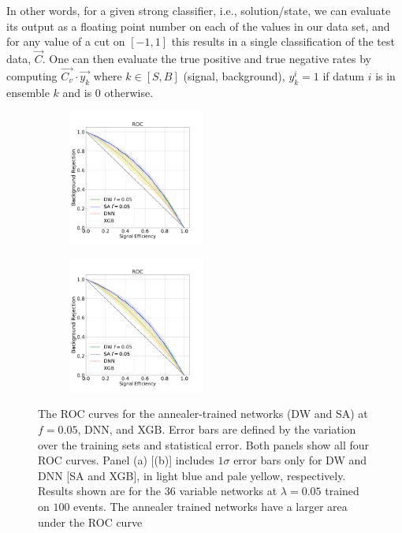 \documentclass[fleqn,10pt]{wlscirep}
\begin{document}
In other words, for a given strong classifier, i.e., solution/state, we can evaluate its output as a floating point number on each of the values in our data set, and for any value of a cut on $[-1,1]$ this results in a single classification of the test data, $\vec{C}$. One can then evaluate the true positive and true negative rates by computing $\vec{C_v}\cdot\vec{y_k}$ where $k\in [S,B]$ (signal, background), $y_k^i=1$ if datum $i$ is in ensemble $k$ and is $0$ otherwise. 

\begin{figure}
\centering
\begin{subfigure}
  \centering
  \includegraphics[width=0.49\textwidth]{ROC_example_100DWDNN}
\end{subfigure}%
\begin{subfigure}
  \centering
\includegraphics[width=0.49\textwidth]{ROC_example_100SAXGB}\end{subfigure}
  \caption{The ROC curves for the annealer-trained networks (DW and SA) at $f=0.05$, DNN, and XGB. Error bars are defined by the variation over the training sets and statistical error. Both panels show all four ROC curves. Panel (a) [(b)] includes $1\sigma$ error bars only for DW and DNN [SA and XGB], in light blue and pale yellow, respectively. Results shown are for the $36$ variable networks at $\lambda=0.05$ trained on $100$ events. The annealer trained networks have a larger area under the ROC curve}
 \label{fig:ROC_example}
  \end{figure}
\end{document}
